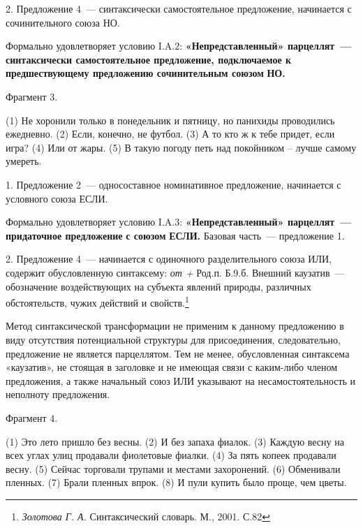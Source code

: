 \documentclass{kursa4}
\begin{document}
{      {2. Предложение 4~--- синтаксически
      самостоятельное предложение, начинается с сочинительного союза НО.}



      {Формально удовлетворяет условию I.A.2:
      }\textbf{{«Непредставленный»
      п}}\textbf{{арцеллят~--- синтаксически самостоятельное
      предложение, подключаемое к предшествующему предложению сочинительным
      союз}}\textbf{{ом}}\textbf{\textit{{
      }}}\textbf{{НО.}}


      \bigskip

      {Фрагмент 3.}

      {(1) Не хоронили только в понедельник и пятницу, но
      панихиды проводились ежедневно. (2) Если, конечно, не футбол. (3) А то
      кто ж к тебе придет, если игра? (4) Или от жары. (5)
      }{В такую погоду петь над покойником –
      лучше самому умереть.}

      {1. Предложение 2~--- односоставное номинативное
      предложение, начинается с условного союза ЕСЛИ.}

      {Формально удовлетворяет условию I.A.3:
      }\textbf{{«Непредставленный» парцеллят~--- придаточное
      предложение }}\textbf{{с союзом
      }}\textbf{{ЕСЛИ}}\textbf{{.
      }}{Базовая часть~--- предложение 1. }

      {2. Предложение 4~--- начинается с одиночного
      разделительного союза ИЛИ, содержит обусловленную синтаксему:
      }\textit{{от + }}{Род.п. Б.9.б.
      Внешний каузатив~--- обозначение воздействующих на субъекта явлений
      природы, различных обстоятельств, чужих действий и
      свойств.}\footnote{\textit{{ Золотова Г. А.
      }}{Синтаксический словарь. М., 2001.
      С.82}}{ }

      {Метод синтаксической трансформации не применим к
      данному предложению в виду отсутствия потенциальной структуры для
      присоединения, следовательно, предложение не является парцеллятом. Тем
      не менее, обусловленная синтаксема «каузатив», не стоящая в заголовке и
      не имеющая связи с каким-либо членом предложения, а также начальный
      союз ИЛИ указывают на несамостоятельность и неполноту предложения. }

      {Фрагмент 4.}

      {(1) Это лето пришло без весны. (2) И без запаха
      фиалок. (3) Каждую весну на всех углах улиц продавали фиолетовые
      фиалки. (4) За пять копеек продавали весну. (5) Сейчас торговали
      трупами и местами захоронений. (6) Обменивали
      }{пленных. (7) Брали пленных впрок. (8) И пули купить
      было проще, чем цветы.}

}
\end{document}
